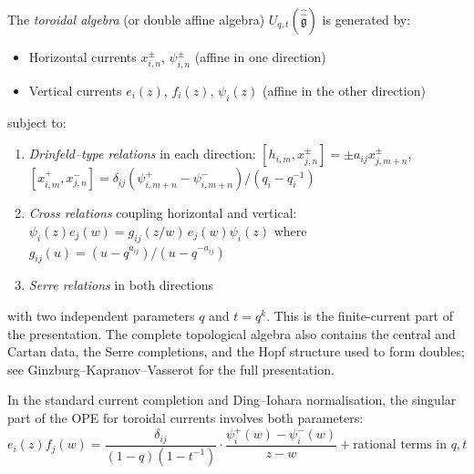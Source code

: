 \begin{definition}\label{def:toroidal}
The \emph{toroidal algebra} (or double affine algebra) $U_{q,t}(\hat{\hat{\mathfrak{g}}})$
is generated by:
\begin{itemize}
\item Horizontal currents $x^\pm_{i,n}$, $\psi^\pm_{i,n}$ (affine in one direction)
\item Vertical currents $e_i(z)$, $f_i(z)$, $\psi_i(z)$ (affine in the other direction)
\end{itemize}
subject to:
\begin{enumerate}
\item \emph{Drinfeld--type relations} in each direction:
$[h_{i,m}, x^\pm_{j,n}] = \pm a_{ij} x^\pm_{j,m+n}$, \quad
$[x^+_{i,m}, x^-_{j,n}] = \delta_{ij} (\psi^+_{i,m+n} - \psi^-_{i,m+n})/(q_i - q_i^{-1})$
\item \emph{Cross relations} coupling horizontal and vertical:
$\psi_i(z) e_j(w) = g_{ij}(z/w) \, e_j(w) \psi_i(z)$
where $g_{ij}(u) = (u - q^{a_{ij}})/(u - q^{-a_{ij}})$
\item \emph{Serre relations} in both directions
\end{enumerate}
with two independent parameters $q$ and $t = q^k$. This is the finite-current
part of the presentation. The complete topological algebra also contains
the central and Cartan data, the Serre completions, and the Hopf structure
used to form doubles; see Ginzburg--Kapranov--Vasserot for the full
presentation.
\end{definition}

\begin{proposition}\label{prop:toroidal-ope}
In the standard current completion and Ding--Iohara normalisation, the
singular part of the OPE for toroidal currents involves both parameters:
\[
e_i(z) f_j(w) = \frac{\delta_{ij}}{(1 - q)(1 - t^{-1})} \cdot
\frac{\psi_i^+(w) - \psi_i^-(w)}{z - w} + \text{rational terms in } q, t
\]
\end{proposition}

